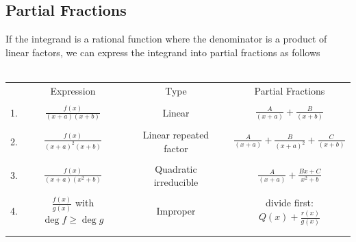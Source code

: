 \documentclass[11pt,a4paper]{article}
\theoremstyle{definition}
\begin{document}
\subsection{Partial Fractions}
If the integrand is a rational function where the denominator is a product of linear factors, we can express the integrand into partial fractions as follows\\\\



\begin{table}[H]
\centering
\begin{tabular}{cccccc}
& Expression && Type && Partial Fractions\\
&&&&&\\
1. & $\frac{f(x)}{\left(x + a\right)\left(x + b\right)}$ && Linear && $\frac{A}{\left(x + a\right)} + \frac{B}{\left(x + b\right)}$\\
&&&&&\\
2. & $\frac{f(x)}{\left(x + a\right)^2\left(x + b\right)}$ && Linear repeated factor && $\frac{A}{\left( x + a\right)} + \frac{B}{\left(x + a\right)^2} + \frac{C}{\left(x + b\right)}$\\
&&&&&\\
3.& $\frac{f(x)}{\left(x + a\right) \left(x^2 + b\right)}$ && Quadratic irreducible && $\frac{A}{\left(x + a\right)} + \frac{Bx + C}{x^2 + b}$\\
&&&&&\\
4. & $\frac{f(x)}{g(x)}$ with $\deg f\geq \deg g$ && Improper && divide first: $Q(x) + \frac{r(x)}{g(x)}$\\
&&&&&\\\\
\end{tabular}
\end{table}
\end{document}
